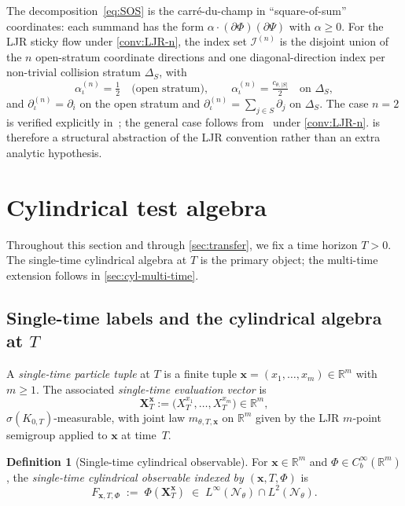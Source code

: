 \documentclass[11pt,reqno]{amsart}
\theoremstyle{plain}
\theoremstyle{definition}
\newtheorem{definition}[theorem]{Definition}
\theoremstyle{remark}
\newcommand{\R}{\mathbb R}
\newcommand{\cN}{\mathcal N}
\newcommand{\cI}{\mathcal I}
\begin{document}
The decomposition~\eqref{eq:SOS} is the carr\'e-du-champ in
``square-of-sum'' coordinates: each summand has the form
$\alpha\cdot(\partial\Phi)(\partial\Psi)$ with $\alpha\ge 0$. For the
LJR sticky flow under \cref{conv:LJR-n}, the index set $\cI^{(n)}$
is the disjoint union of the $n$ open-stratum coordinate directions
and one diagonal-direction index per non-trivial collision stratum
$\Delta_{S}$, with
\[
  \alpha^{(n)}_{\iota}=\tfrac12\quad\text{(open stratum)},\qquad
  \alpha^{(n)}_{\iota}=\tfrac{c_{\theta,|S|}}{2}\quad\text{on }\Delta_{S},
\]
and $\partial^{(n)}_{\iota}=\partial_{i}$ on the open stratum and
$\partial^{(n)}_{\iota}=\sum_{j\in S}\partial_{j}$ on $\Delta_{S}$.
The case $n=2$ is verified explicitly
in~\cite[Lem.~5.2 and proof of Thm.~6.2]{StickyFlowGammaSeed};
the general case follows from~\cite[\S 3]{LeJanRaimond2004} under
\cref{conv:LJR-n}.  is therefore a structural
abstraction of the LJR convention rather than an extra analytic
hypothesis.

\section{Cylindrical test algebra}\label{sec:cyl-algebra}

Throughout this section and through \cref{sec:transfer}, we fix a
time horizon $T>0$. The single-time cylindrical algebra at $T$ is
the primary object; the multi-time extension follows in
\cref{sec:cyl-multi-time}.

\subsection{Single-time labels and the cylindrical algebra at \texorpdfstring{$T$}{T}}\label{sec:cyl-def-1t}

A \emph{single-time particle tuple} at $T$ is a finite tuple
$\mathbf x=(x_{1},\ldots,x_{m})\in\R^{m}$ with $m\ge 1$. The
associated \emph{single-time evaluation vector} is
\begin{equation}\label{eq:X-T-x}
  \mathbf X_{T}^{\mathbf x}
  :=\bigl(X_{T}^{x_{1}},\ldots,X_{T}^{x_{m}}\bigr)\in\R^{m},
\end{equation}
$\sigma(K_{0,T})$-measurable, with joint law
$m_{\theta,T,\mathbf x}$ on $\R^{m}$ given by the LJR $m$-point
semigroup applied to $\mathbf x$ at time~$T$.

\begin{definition}[Single-time cylindrical observable]\label{def:cyl-observable-1t}
For $\mathbf x\in\R^{m}$ and $\Phi\in C_{b}^{\infty}(\R^{m})$, the
\emph{single-time cylindrical observable indexed by
$(\mathbf x,T,\Phi)$} is
\begin{equation}\label{eq:F-x-T-Phi}
  F_{\mathbf x,T,\Phi}\;:=\;\Phi(\mathbf X_{T}^{\mathbf x})
  \;\in\;L^{\infty}(\cN_{\theta})\cap L^{2}(\cN_{\theta}).
\end{equation}
\end{definition}
\end{document}

